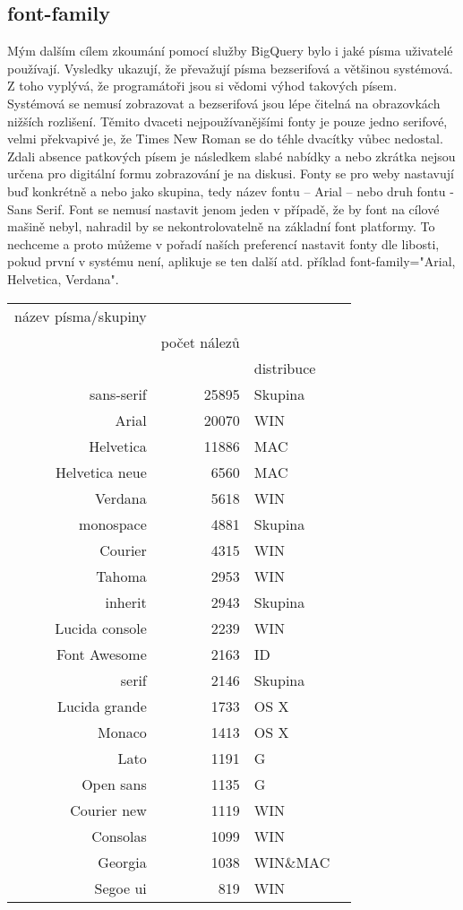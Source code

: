 \documentclass[a4paper]{article}
\begin{document}
\subsection{font-family}
Mým dalším cílem zkoumání pomocí služby BigQuery bylo i jaké písma uživatelé používají. Vysledky ukazují, že převažují písma bezserifová a většinou systémová. Z toho vyplývá, že programátoři jsou si vědomi výhod takových písem. Systémová se nemusí zobrazovat a bezserifová jsou lépe čitelná na obrazovkách nižších rozlišení. Těmito dvaceti nejpoužívanějšími fonty je pouze jedno serifové, velmi překvapivé je, že Times New Roman se do téhle dvacítky vůbec nedostal. Zdali absence patkových písem je následkem slabé nabídky a nebo zkrátka nejsou určena pro digitální formu zobrazování je na diskusi. Fonty se pro weby nastavují buď konkrétně a nebo jako skupina, tedy název fontu – Arial – nebo druh fontu - Sans Serif. Font se nemusí nastavit jenom jeden v případě, že by font na cílové mašině nebyl, nahradil by se nekontrolovatelně na základní font platformy. To nechceme a proto můžeme v pořadí naších preferencí nastavit fonty dle libosti, pokud první v systému není, aplikuje se ten další atd. příklad font-family="Arial, Helvetica, Verdana".

\begin{tabular}{r|rlr}
název písma/skupiny & \\
& počet nálezů & \\
&& distribuce&\\
\midrule
sans-serif & 25895 &  Skupina\\
Arial & 20070 & WIN\\
Helvetica & 11886 & MAC\\
Helvetica neue & 6560 & MAC\\
Verdana & 5618 & WIN\\
monospace & 4881 & Skupina\\
Courier & 4315 & WIN\\
Tahoma & 2953 & WIN\\
inherit & 2943 & Skupina\\
Lucida console & 2239 & WIN\\
Font Awesome & 2163 & ID\\
serif & 2146 & Skupina\\
Lucida grande & 1733 & OS X\\
Monaco & 1413 & OS X\\
Lato & 1191 & G\\
Open sans & 1135 & G\\
Courier new & 1119 & WIN\\
Consolas & 1099 & WIN\\
Georgia &  1038 & WIN\&MAC\\
Segoe ui & 819 & WIN\\
\end{tabular}
\end{document}
